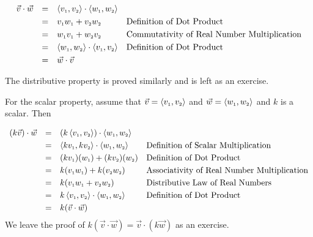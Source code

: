 \[ \begin{array}{rcll}

\vec{v} \cdot \vec{w} & = & \left<v_{\mbox{\tiny $1$}},v_{\mbox{\tiny $2$}}\right>  \cdot \left<w_{\mbox{\tiny $1$}},w_{\mbox{\tiny $2$}}\right>  & \\ [3pt]
										 & = & v_{\mbox{\tiny $1$}}w_{\mbox{\tiny $1$}} + v_{\mbox{\tiny $2$}}w_{\mbox{\tiny $2$}} & \text{Definition of Dot Product} \\ [3pt]
										 & = & w_{\mbox{\tiny $1$}}v_{\mbox{\tiny $1$}} + w_{\mbox{\tiny $2$}}v_{\mbox{\tiny $2$}} & \text{Commutativity of Real Number Multiplication} \\ [3pt]
										 & = & \left<w_{\mbox{\tiny $1$}},w_{\mbox{\tiny $2$}}\right>  \cdot  \left<v_{\mbox{\tiny $1$}},v_{\mbox{\tiny $2$}}\right>  & \text{Definition of Dot Product} \\ [3pt]
										 & = & \vec{w} \cdot \vec{v} & \\ \end{array} \]

The distributive property is proved similarly and is left as an exercise.

\smallskip

For the scalar property, assume that $\vec{v} = \left<v_{\mbox{\tiny $1$}},v_{\mbox{\tiny $2$}}\right>$ and $\vec{w} = \left<w_{\mbox{\tiny $1$}},w_{\mbox{\tiny $2$}}\right>$ and $k$ is a scalar.  Then

\[ \begin{array}{rcll}

(k\vec{v}) \cdot \vec{w} & = & \left(k \left<v_{\mbox{\tiny $1$}},v_{\mbox{\tiny $2$}}\right> \right) \cdot \left<w_{\mbox{\tiny $1$}},w_{\mbox{\tiny $2$}}\right> & \\ [3pt]
												 & = &  \left<kv_{\mbox{\tiny $1$}},kv_{\mbox{\tiny $2$}}\right>  \cdot \left<w_{\mbox{\tiny $1$}},w_{\mbox{\tiny $2$}}\right> & \text{Definition of Scalar Multiplication} \\ [3pt]
												 & = & (kv_{\mbox{\tiny $1$}})(w_{\mbox{\tiny $1$}}) + (kv_{\mbox{\tiny $2$}})(w_{\mbox{\tiny $2$}}) & \text{Definition of Dot Product} \\ [3pt]
												 & = & k(v_{\mbox{\tiny $1$}}w_{\mbox{\tiny $1$}}) + k(v_{\mbox{\tiny $2$}}w_{\mbox{\tiny $2$}}) & \text{Associativity of Real Number Multiplication} \\ [3pt]
												 & = & k(v_{\mbox{\tiny $1$}}w_{\mbox{\tiny $1$}} + v_{\mbox{\tiny $2$}}w_{\mbox{\tiny $2$}}) & \text{Distributive Law of Real Numbers} \\ [3pt]
												 & = & k \left<v_{\mbox{\tiny $1$}},v_{\mbox{\tiny $2$}}\right>  \cdot \left<w_{\mbox{\tiny $1$}},w_{\mbox{\tiny $2$}}\right> & \text{Definition of Dot Product} \\ [3pt]
												 & = & k (\vec{v} \cdot \vec{w}) & \\ \end{array} \]
\enlargethispage{.25in} We leave the proof of $k(\vec{v} \cdot \vec{w}) = \vec{v} \cdot (k \vec{w})$ as an exercise.

